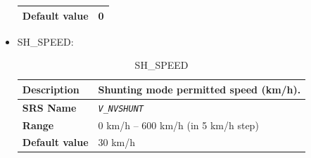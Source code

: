 \begin{itemize}
\begin{longtable}{|l|l|}
				\hline

					\begin{minipage}[t]{0.22\linewidth} \textbf{Default value}	\end{minipage}
				&	\begin{minipage}[t]{0.78\linewidth} 0 \end{minipage} \\

				\hline

			\end{longtable}


		\item SH\_SPEED:
			\begin{longtable}{|l|l|}
				\caption{SH\_SPEED}\\
				\hline

					\begin{minipage}[t]{0.22\linewidth} \textbf{Description}	\end{minipage}
				&	\begin{minipage}[t]{0.78\linewidth} Shunting mode permitted speed (km/h). \end{minipage} \\

				\hline

					\begin{minipage}[t]{0.22\linewidth} \textbf{SRS Name}	\end{minipage}
				&	\begin{minipage}[t]{0.78\linewidth} \emph{\texttt{V\_NVSHUNT}} \end{minipage} \\

				\hline

					\begin{minipage}[t]{0.22\linewidth} \textbf{Range}	\end{minipage}
				&	\begin{minipage}[t]{0.78\linewidth} 0 km/h – 600 km/h (in 5 km/h step) \end{minipage} \\

				\hline

					\begin{minipage}[t]{0.22\linewidth} \textbf{Default value}	\end{minipage}
				&	\begin{minipage}[t]{0.78\linewidth} 30 km/h \end{minipage} \\


\end{longtable}
\end{itemize}
